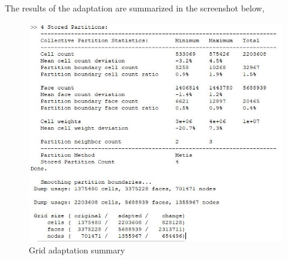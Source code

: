The results of the adaptation are summarized in the screenshot below,

\begin{figure}[H]
     \centering
	 \includegraphics[width=\textwidth]{report_images/adaptation_summary.jpg}
	 \caption{Grid adaptation summary}
	 \label{fig: adapt_summary}
\end{figure}
	
